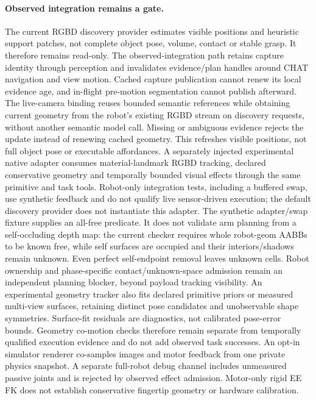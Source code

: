 \paragraph{Observed integration remains a gate.}
The current RGBD discovery provider estimates visible positions and heuristic
support patches, not complete object pose, volume, contact or stable grasp.
It therefore remains read-only. The observed-integration path retains capture identity through perception and invalidates
evidence/plan handles around CHAT navigation and view motion. Cached capture
publication cannot renew its local evidence age, and in-flight pre-motion
segmentation cannot publish afterward. The live-camera binding reuses bounded
semantic references while obtaining current geometry from the robot's existing
RGBD stream on discovery requests, without another semantic model call. Missing
or ambiguous evidence rejects the update instead of renewing cached geometry.
This refreshes visible positions, not full object pose or executable affordances.
A separately injected experimental native adapter consumes material-landmark RGBD
tracking, declared conservative geometry and temporally bounded visual effects
through the same primitive and task tools. Robot-only integration tests, including
a buffered swap, use synthetic feedback and do not qualify live sensor-driven
execution; the default discovery provider does not instantiate this adapter.
The synthetic adapter/swap fixture supplies an all-free predicate. It does not
validate arm planning from a self-occluding depth map: the current checker requires
whole robot-geom AABBs to be known free, while self surfaces are occupied and
their interiors/shadows remain unknown. Even perfect self-endpoint removal leaves
unknown cells. Robot ownership and phase-specific contact/unknown-space admission
remain an independent planning blocker, beyond payload tracking visibility.
An experimental geometry tracker also fits declared primitive priors or measured
multi-view surfaces, retaining distinct pose candidates and unobservable shape
symmetries. Surface-fit residuals are diagnostics, not calibrated pose-error
bounds. Geometry co-motion checks therefore remain separate from temporally
qualified execution evidence and do not add observed task successes.
An opt-in simulator renderer co-samples images and motor feedback from one private
physics snapshot. A separate full-robot debug channel includes unmeasured passive
joints and is rejected by observed effect admission. Motor-only rigid EE FK does
not establish conservative fingertip geometry or hardware calibration.
